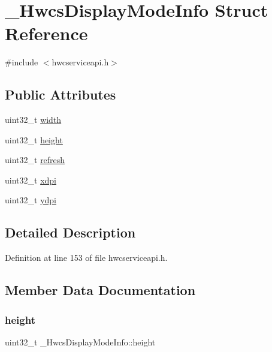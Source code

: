 \hypertarget{struct__HwcsDisplayModeInfo}{}\section{\+\_\+\+Hwcs\+Display\+Mode\+Info Struct Reference}
\label{struct__HwcsDisplayModeInfo}


{\ttfamily \#include $<$hwcserviceapi.\+h$>$}

\subsection*{Public Attributes}
\begin{DoxyCompactItemize}
\item 
uint32\+\_\+t \mbox{\hyperlink{struct__HwcsDisplayModeInfo_a50ed795465b52cda71e38e0c5eae2804}{width}}
\item 
uint32\+\_\+t \mbox{\hyperlink{struct__HwcsDisplayModeInfo_a89f5474962a13b045ce25b84929c6be3}{height}}
\item 
uint32\+\_\+t \mbox{\hyperlink{struct__HwcsDisplayModeInfo_afbc17f7325634fd5b86eeb0a2023c635}{refresh}}
\item 
uint32\+\_\+t \mbox{\hyperlink{struct__HwcsDisplayModeInfo_ad8d33821439c3aeb8b125296cb62dbbb}{xdpi}}
\item 
uint32\+\_\+t \mbox{\hyperlink{struct__HwcsDisplayModeInfo_a53ef1f5ece0baea9b74b76dbf9c0fc19}{ydpi}}
\end{DoxyCompactItemize}


\subsection{Detailed Description}


Definition at line 153 of file hwcserviceapi.\+h.



\subsection{Member Data Documentation}
\mbox{\label{struct__HwcsDisplayModeInfo_a89f5474962a13b045ce25b84929c6be3}} 
\subsubsection{\texorpdfstring{height}{height}}
{\footnotesize\ttfamily uint32\+\_\+t \+\_\+\+Hwcs\+Display\+Mode\+Info\+::height}



